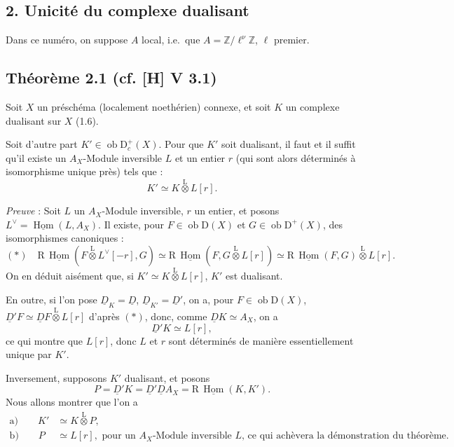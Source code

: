 \documentclass[11pt]{article}
\DeclareMathOperator{\Hom}{Hom}
\newcommand{\R}{\mathrm{R}}\newcommand{\RHomCore}{\mathrm{RHom}}
\newcommand{\D}{\mathrm{D}}
\newcommand{\Z}{\mathbb{Z}}
\newcommand{\ob}{\operatorname{ob}}
\providecommand{\Hom}{\operatorname{Hom}}
\providecommand{\ob}{\operatorname{ob}}
\providecommand{\R}{\mathrm R}
\providecommand{\Z}{\mathbb Z}
\providecommand{\Hom}{\operatorname{Hom}}
\begin{document}
\subsection*{2. Unicité du complexe dualisant}

Dans ce numéro, on suppose $A$ local, i.e.~que $A = \Z/\ell^{\nu}\Z$, $\ell$ premier.

\subsection*{Théorème 2.1 (cf. [H] V 3.1)}
Soit $X$ un préschéma (localement noethérien) connexe, et soit $K$ un complexe dualisant sur $X$ (1.6).

Soit d'autre part $K' \in \ob \D_c^{+}(X)$. Pour que $K'$ soit dualisant, il faut et il suffit qu'il existe un $A_X$-Module inversible $L$ et un entier $r$ (qui sont 
alors
déterminés à isomorphisme unique près) tels que :
\[
K' \simeq K \mathop{\otimes}\limits^{\mathrm{L}} L[r].
\]

\emph{Preuve} : Soit $L$ un $A_X$-Module inversible, $r$ un entier, et posons $L^{\vee} = \underline{\Hom}(L, A_X)$. Il existe, pour $F \in \ob \D(X)$ et $G \in \ob \D^{+}(X)$, des isomorphismes canoniques :
\[
(*) \quad \R\,\underline{\Hom}(F \mathop{\otimes}\limits^{\mathrm{L}} L^{\vee}[-r], G) \simeq \R\,\underline{\Hom}(F, G \mathop{\otimes}\limits^{\mathrm{L}} L[r]) \simeq \R\,\underline{\Hom}(F,G) \mathop{\otimes}\limits^{\mathrm{L}} L[r].
\]
On en déduit aisément que, si $K' \simeq K \mathop{\otimes}\limits^{\mathrm{L}} L[r]$, $K'$ est dualisant.

En outre, si l'on pose $\underline{D}_K = \underline{D}$, $\underline{D}_{K'} = \underline{D}'$, on a, pour $F \in \ob \D(X)$, $\underline{D}'F \simeq \underline{D} F \mathop{\otimes}\limits^{\mathrm{L}} L[r]$ d'après $(*)$, donc, comme $\underline{D} K \simeq A_X$, on a
\[
\underline{D}' K \simeq L[r],
\]
ce qui montre que $L[r]$, donc $L$ et $r$ sont déterminés de manière essentiellement unique par $K'$.

Inversement, supposons $K'$ dualisant, et posons
\[
P = \underline{D}'K = \underline{D}'\underline{D} A_X = \R\,\underline{\Hom}(K,K').
\]
Nous allons montrer que l'on a
\begin{align*}
\text{a)} \qquad K' &\simeq K \mathop{\otimes}\limits^{\mathrm{L}} P, \\
\text{b)} \qquad P &\simeq L[r], \text{ pour un $A_X$-Module inversible $L$, ce qui achèvera la démonstration du théorème.}
\end{align*}
\end{document}
